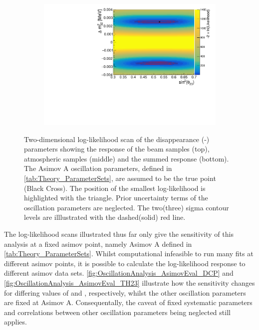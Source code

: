 \begin{figure}[h]
\begin{subfigure}[t]{1.0\textwidth}
    \includegraphics[width=\textwidth, trim={0mm 0mm 0mm 0mm}, clip,page=3]{Figures/OA/DisappearanceScans.pdf}
  \end{subfigure}
  \caption{Two-dimensional log-likelihood scan of the disappearance (\sinsqatm-\delmsqatm) parameters showing the response of the beam samples (top), atmospheric samples (middle) and the summed response (bottom). The Asimov A oscillation parameters, defined in \autoref{tab:Theory_ParameterSets}, are assumed to be the true point (Black Cross). The position of the smallest log-likelihood is highlighted with the triangle. Prior uncertainty terms of the oscillation parameters are neglected. The two(three) sigma contour levels are illlustrated with the dashed(solid) red line.}
  \label{fig:OscillationAnalysis_2DLLHOscScans_Dis}
\end{figure}

The log-likelihood scans illustrated thus far only give the sensitivity of this analysis at a fixed asimov point, namely Asimov A defined in \autoref{tab:Theory_ParameterSets}. Whilst computational infeasible to run many fits at different asimov points, it is possible to calculate the log-likelihood response to different asimov data sets. \autoref{fig:OscillationAnalysis_AsimovEval_DCP} and \autoref{fig:OscillationAnalysis_AsimovEval_TH23} illustrate how the sensitivity changes for differing values of \dcp and \sinsqatm, respectively, whilst the other oscillation parameters are fixed at Asimov A. Consequentally, the caveat of fixed systematic parameters and correlations between other oscillation parameters being neglected still applies.

